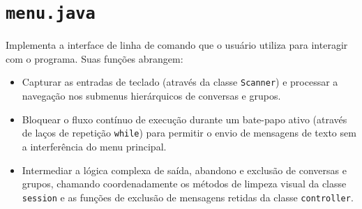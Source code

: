 \documentclass{report}
\begin{document}
\section{\texttt{menu.java}}
Implementa a interface de linha de comando que o usuário utiliza para interagir com o programa. Suas funções abrangem:
\begin{itemize}
    \item Capturar as entradas de teclado (através da classe \texttt{Scanner}) e processar a navegação nos submenus hierárquicos de conversas e grupos.
    \item Bloquear o fluxo contínuo de execução durante um bate-papo ativo (através de laços de repetição \texttt{while}) para permitir o envio de mensagens de texto sem a interferência do menu principal.
    \item Intermediar a lógica complexa de saída, abandono e exclusão de conversas e grupos, chamando coordenadamente os métodos de limpeza visual da classe \texttt{session} e as funções de exclusão de mensagens retidas da classe \texttt{controller}.
\end{itemize}
\end{document}
